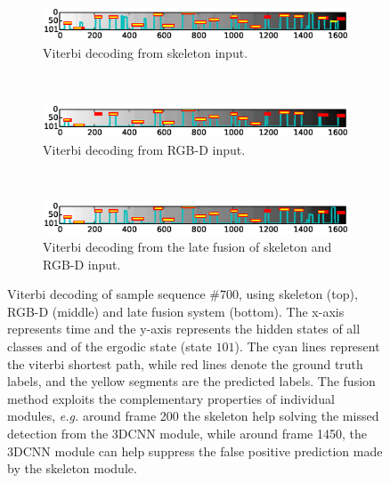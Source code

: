 \begin{figure}[t]
        \centering
        \begin{subfigure}[c]{.85\textwidth}
                \includegraphics[width=\textwidth]{images/path/Sample0700_sk}
                \caption{\small{Viterbi decoding from skeleton input.}}
                \label{Sample0700_sk}
        \end{subfigure}%
        ~ %

        \begin{subfigure}[c]{0.85\textwidth}
                \includegraphics[width=\textwidth]{images/path/Sample0700_cnn}
                \caption{\small{Viterbi decoding from RGB-D input.}}
                \label{Sample0700_cnn}
        \end{subfigure}

        ~ %
        \begin{subfigure}[c]{0.85\textwidth}
                \includegraphics[width=\textwidth]{images/path/Sample0700_combined}
                \caption{\small{Viterbi decoding from the late fusion of skeleton and RGB-D input.}}
                \label{Sample0700_combined}
        \end{subfigure}
\vspace*{-3mm}
  \caption{
  \small{Viterbi decoding of sample sequence \#700, using skeleton (top), RGB-D (middle) and late fusion system (bottom).
The x-axis represents time and the y-axis represents the hidden states of all classes and of the ergodic state (state $101$).
The cyan lines represent the viterbi shortest path, while red lines denote the ground truth labels,
and the yellow segments  are the predicted labels.
The fusion method exploits the complementary properties of individual modules, \emph{e.g.} around frame 200 the skeleton
help solving  the missed detection from the 3DCNN module,
while around frame 1450, the 3DCNN module can help suppress the false positive prediction made by the skeleton module.
}}
\label{fig:Sample0700_comparison}
\end{figure}

